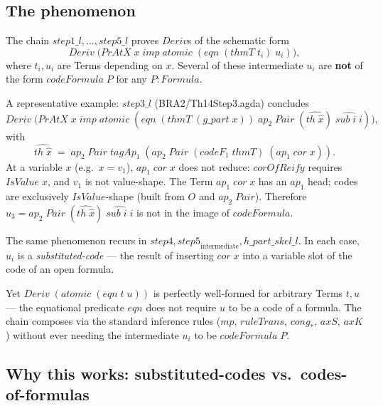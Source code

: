 \documentclass[11pt]{article}
\begin{document}
\subsection{The phenomenon}

The chain $\mathit{step1\_l},\dots,\mathit{step5\_l}$ proves
$\mathit{Deriv}$s of the schematic form
\[
  \mathit{Deriv}\;\bigl(\mathit{PrAtX}\;x \;\mathit{imp}\;
    \mathit{atomic}\;(\mathit{eqn}\;(\mathit{thmT}\;t_i)\;u_i)\bigr),
\]
where $t_i, u_i$ are Terms depending on $x$.  Several of these
intermediate $u_i$ are \textbf{not} of the form $\mathit{codeFormula}\;P$
for any $P : \mathit{Formula}$.

A representative example: $\mathit{step3\_l}$ (BRA2/Th14Step3.agda)
concludes
\[
  \mathit{Deriv}\;\bigl(\mathit{PrAtX}\;x \;\mathit{imp}\;
    \mathit{atomic}\;(\mathit{eqn}\;(\mathit{thmT}\;(g\_\mathit{part}\;x))\;
      \mathit{ap}_2\;\mathit{Pair}\;(\widehat{\mathit{th}\;\hat x})\;\widehat{\mathit{sub}\;i\;i})\bigr),
\]
with
\[
  \widehat{\mathit{th}\;\hat x}
   \;=\; \mathit{ap}_2\;\mathit{Pair}\;\mathit{tagAp}_1\;
        (\mathit{ap}_2\;\mathit{Pair}\;(\mathit{codeF}_1\;\mathit{thmT})\;(\mathit{ap}_1\;\mathit{cor}\;x)).
\]
At a variable $x$ (e.g.\ $x = v_1$), $\mathit{ap}_1\;\mathit{cor}\;x$
does not reduce: $\mathit{corOfReify}$ requires $\mathit{IsValue}\;x$,
and $v_1$ is not value-shape.  The Term
$\mathit{ap}_1\;\mathit{cor}\;x$ has an $\mathit{ap}_1$ head; codes
are exclusively $\mathit{IsValue}$-shape (built from $O$ and
$\mathit{ap}_2\;\mathit{Pair}$).  Therefore $u_3 = \mathit{ap}_2\;
\mathit{Pair}\;(\widehat{\mathit{th}\;\hat x})\;\widehat{\mathit{sub}\;i\;i}$
is not in the image of $\mathit{codeFormula}$.

The same phenomenon recurs in $\mathit{step4}, \mathit{step5}_{\mathrm{intermediate}},
h\_\mathit{part}\_\mathit{skel}\_l$.  In each case, $u_i$ is a
\emph{substituted-code} --- the result of inserting $\mathit{cor}\;x$
into a variable slot of the code of an open formula.

Yet $\mathit{Deriv}\;(\mathit{atomic}\;(\mathit{eqn}\;t\;u))$ is
perfectly well-formed for arbitrary Terms $t, u$ --- the equational
predicate $\mathit{eqn}$ does not require $u$ to be a code of a formula.
The chain composes via the standard inference rules ($\mathit{mp}$,
$\mathit{ruleTrans}$, $\mathit{cong}_*$, $\mathit{axS}$, $\mathit{axK}$)
without ever needing the intermediate $u_i$ to be $\mathit{codeFormula}\;P$.

\subsection{Why this works: substituted-codes vs.\ codes-of-formulas}
\end{document}
